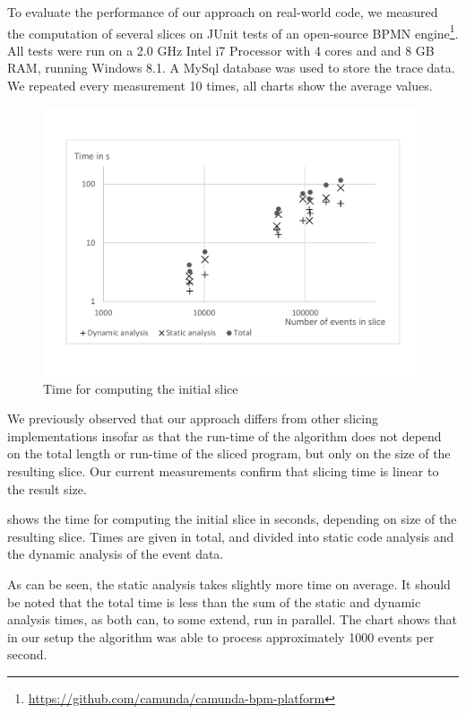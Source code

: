 ﻿\documentclass[
      english,
			conference,
      ]{IEEEtran}
\begin{document}
To evaluate the performance of our approach on real-world code, we measured the computation of several slices on JUnit tests of an open-source BPMN engine\footnote{\url{https://github.com/camunda/camunda-bpm-platform}}.
All tests were run on a 2.0 GHz Intel i7 Processor with 4 cores and and 8 GB RAM, running Windows 8.1.
A MySql database was used to store the trace data.
We repeated every measurement 10 times, all charts show the average values.

\begin{figure}
	\centering
		\includegraphics[width=\linewidth, clip, trim={20mm 26mm 20mm 26mm}]{chart-initial.pdf}
	\caption{Time for computing the initial slice}
	\label{fig:chartinitial}
\end{figure}

We previously observed that our approach differs from other slicing implementations insofar as that the run-time of the algorithm does not depend on the total length or run-time of the sliced program, but only on the size of the resulting slice\cite{treffer_dynamic_2014}.
Our current measurements confirm that slicing time is linear to the result size.

 shows the time for computing the initial slice in seconds, depending on size of the resulting slice.
Times are given in total, and divided into static code analysis and the dynamic analysis of the event data.

As can be seen, the static analysis takes slightly more time on average.
It should be noted that the total time is less than the sum of the static and dynamic analysis times, as both can, to some extend, run in parallel.
The chart shows that in our setup the algorithm was able to process approximately 1000 events per second.
\end{document}
